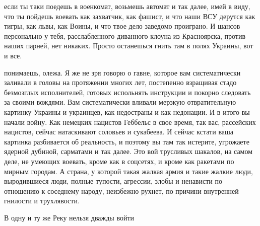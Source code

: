 если ты таки поедешь в военкомат, возьмешь автомат и так далее, имей в виду,
что ты пойдешь воевать как захватчик, как фашист, и что наши ВСУ дерутся как
тигры, как львы, как Воины, и что твое дело заведомо проиграно. И шансов
персонально у тебя, расслабленного диванного клоуна из Красноярска, против
наших парней, нет никаких. Просто останешься гнить там в полях Украины, вот и
все.

понимаешь, олежа. Я же не зря говорю о гавне, которое вам систематически
заливали в головы на протяжении многих лет, постепенно взращивая стадо
безмозглых исполнителей, готовых испольнять инструкции и покорно следовать за
своими вождями. Вам систематически вливали мерзкую отвратительную картинку
Украины и украинцев, как недостраны и как недонации. И в итого вы начали войну.
Как немецких нацистов Геббельс в свое время, так вас, рассейских нацистов,
сейчас натаскивают соловьев и сукабеева. И сейчас кстати ваша картинка
разбивается об реальность, и поэтому вы там так истерите, угрожаете ядерной
дубиной, сарматами и так далее. Это вой трусливых шакалов, на самом деле, не
умеющих воевать, кроме как в соцсетях, и кроме как ракетами по мирным городам.
А страна, у которой такая жалкая армия и такие жалкие люди, выродившиеся люди,
полные тупости, агрессии, злобы и ненависти по отношению к соседнему народу,
неизбежно рухнет, по причини внутренней гнилости и трухлявости.



В одну и ту же Реку нельзя дважды войти

